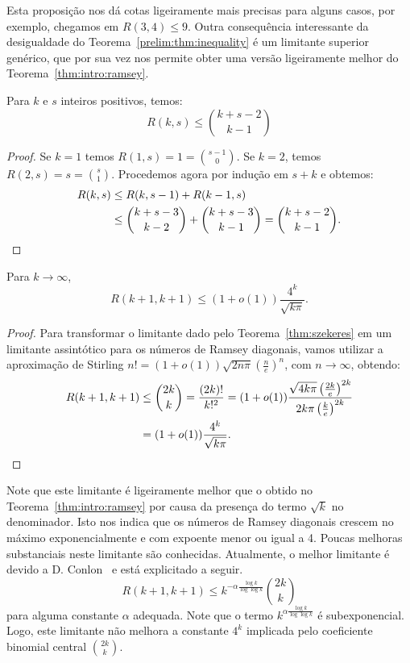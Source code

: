 Esta proposição nos dá cotas ligeiramente mais precisas para alguns casos, por exemplo, chegamos em $R(3,4) \leq 9$. Outra consequência interessante da desigualdade do Teorema~\ref{prelim:thm:inequality} é um limitante superior genérico, que por sua vez nos permite obter uma versão ligeiramente melhor do Teorema~\ref{thm:intro:ramsey}.

\begin{theorem}
\label{thm:szekeres}
Para $k$ e $s$ inteiros positivos, temos:
\[R(k,s) \leq \binom{k + s - 2}{k - 1}\]
\end{theorem}
\begin{proof}
Se $k = 1$ temos $R(1,s) = 1 = \binom{s - 1}{0}$. Se $k = 2$, temos $R(2,s) = s = \binom{s}{1}$. Procedemos agora por indução em $s + k$ e obtemos:
\begin{align*}
  R(k,s) &\leq R(k,s-1) + R(k-1,s) \\
  &\leq \binom{k + s - 3}{k - 2} + \binom{k + s - 3}{k - 1} = \binom{k + s - 2}{k - 1}. \qedhere
\end{align*}
\end{proof}

\begin{corollary}
\label{col:szekeres}
Para $k \to \infty$,
\[ \displaystyle R(k+1,k+1) \leq (1+o(1))\frac{4^k}{\sqrt{k \pi}}.\]
\end{corollary}
\begin{proof}
Para transformar o limitante dado pelo Teorema~\ref{thm:szekeres} em um limitante assintótico para os números de Ramsey diagonais, vamos utilizar a aproximação de Stirling $n! = (1+o(1)) \sqrt{2n \pi} \left ( \frac{n}{e} \right)^n $, com $n \to \infty$, obtendo:
\begin{align*}
R(k+1,k+1) &\leq \binom{2k}{k} = \frac{(2k)!}{k!^2} = (1 +o(1)) \frac{\sqrt{4 k \pi} \left ( \frac{2k}{e} \right)^{2k} }{2k\pi \left ( \frac{k}{e} \right)^{2k} } \\
&= (1 +o(1))\frac{4^k}{\sqrt{k\pi}}. \qedhere
\end{align*}
\end{proof}

Note que este limitante é ligeiramente melhor que o obtido no Teorema~\ref{thm:intro:ramsey} por causa da presença do termo $\sqrt{k}$ no denominador. Isto nos indica que os números de Ramsey diagonais crescem no máximo exponencialmente e com expoente menor ou igual a 4. Poucas melhoras substanciais neste limitante são conhecidas. Atualmente, o melhor limitante é devido a D. Conlon~\cite{conlon} e está explicitado a seguir.
\[R(k+1,k+1) \leq k^{-\alpha\frac{\log k}{\log \log k}} \binom{2k}{k}\]
para alguma constante $\alpha$ adequada. Note que o termo $k^{\alpha\frac{\log k}{\log \log k}}$ é subexponencial. Logo, este limitante não melhora a constante $4^k$ implicada pelo coeficiente binomial central $\binom{2k}{k}$.

